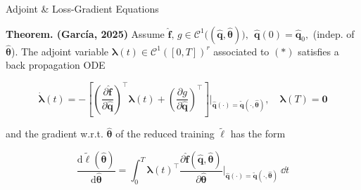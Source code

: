 \begin{frame}{Adjoint \& Loss-Gradient Equations}
    
\textbf{Theorem. (García, 2025)} Assume $\hat{\mathbf{f}},\,g \in \mathcal{C}^1\bigl((\hat{\mathbf{q}},\hat{\bm{\theta}})\bigr), ~~
\hat{\mathbf{q}}(0)=\hat{\mathbf{q}}_0,$ (indep. of $\hat{\bm{\theta}}$). The \textcolor{codeblue}{adjoint variable} $\bm{\lambda}(t)\in\mathcal{C}^1([0,T])^r$ associated to $\bm{(*)}$ satisfies a back propagation ODE
\begin{center}
\begin{tcolorbox}[width=12.8cm, colback=gray!10, colframe=gray!50, boxrule=0.5pt, arc=2pt]
\begin{equation*}
        \dot{\bm{\lambda}}(t) = -\left[ \left(\dfrac{\partial \hat{\mathbf{f}}}{\partial\hat{\mathbf{q}}}\right)^{\top}\bm{\lambda}(t) + \left( \dfrac{\partial g}{\partial \hat{\mathbf{q}}} \right)^{\top} \right]\Bigg\vert_{\hat{\mathbf{q}}(\cdot) = \tilde{\mathbf{q}}(\cdot, \hat{\bm{\theta}} ) },\quad\bm{\lambda}(T)=\bm{0}
        \label{eq:adjoint_eqs}
    \end{equation*}
\end{tcolorbox}\end{center}
and the \textcolor{codeblue}{gradient} w.r.t. $\hat{\bm{\theta}}$ of the reduced training $\tilde\ell$ has the form
\vspace{0.1cm}
\begin{center}
\begin{tcolorbox}[width=9.7cm, colback=gray!10, colframe=gray!50, boxrule=0.5pt, arc=2pt]
\begin{equation*}
        \frac{\mathrm{d}\tilde{\ell}(\hat{\bm{\theta}})}{\mathrm{d}\hat{\bm{\theta}}}
   = \int_0^T \bm{\lambda}(t)^{\top}\dfrac{\partial\hat{\mathbf{f}}(\hat{\mathbf{q}},\hat{\bm{\theta}})}{\partial\hat{\bm{\theta}}}\Bigg\vert_{\hat{\mathbf{q}}(\cdot) = \tilde{\mathbf{q}}(\cdot, \hat{\bm{\theta}} ) }~\dd t
        \label{eq:gradient_lagrange}
    \end{equation*}
\end{tcolorbox}\end{center}
    
\end{frame}


